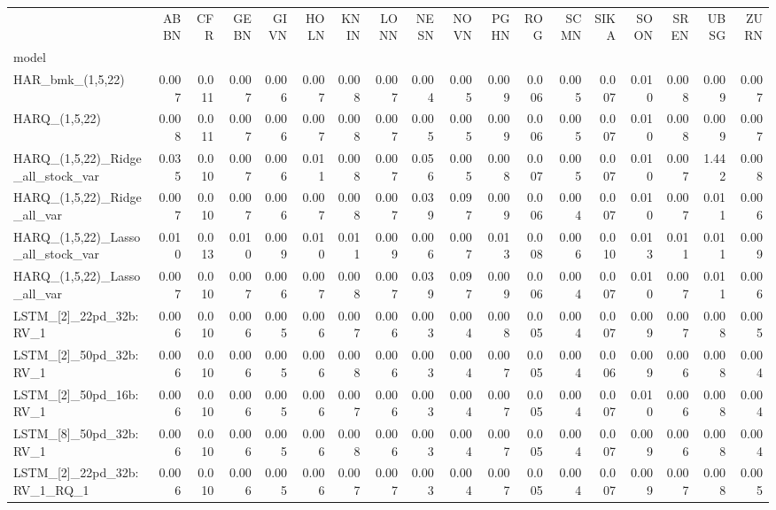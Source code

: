 \begin{tabular}{lrrrrrrrrrrrrrrrrr}
\toprule
 & ABBN & CFR & GEBN & GIVN & HOLN & KNIN & LONN & NESN & NOVN & PGHN & ROG & SCMN & SIKA & SOON & SREN & UBSG & ZURN \\
model &  &  &  &  &  &  &  &  &  &  &  &  &  &  &  &  &  \\
\midrule
HAR\_bmk\_(1,5,22) & 0.007 & 0.011 & 0.007 & 0.006 & 0.007 & 0.008 & 0.007 & 0.004 & 0.005 & 0.009 & 0.006 & 0.005 & 0.007 & 0.010 & 0.008 & 0.009 & 0.007 \\
HARQ\_(1,5,22) & 0.008 & 0.011 & 0.007 & 0.006 & 0.007 & 0.008 & 0.007 & 0.005 & 0.005 & 0.009 & 0.006 & 0.005 & 0.007 & 0.010 & 0.008 & 0.009 & 0.007 \\
HARQ\_(1,5,22)\_Ridge\_all\_stock\_var & 0.035 & 0.010 & 0.007 & 0.006 & 0.011 & 0.008 & 0.007 & 0.056 & 0.005 & 0.008 & 0.007 & 0.005 & 0.007 & 0.010 & 0.007 & 1.442 & 0.008 \\
HARQ\_(1,5,22)\_Ridge\_all\_var & 0.007 & 0.010 & 0.007 & 0.006 & 0.007 & 0.008 & 0.007 & 0.039 & 0.097 & 0.009 & 0.006 & 0.004 & 0.007 & 0.010 & 0.007 & 0.011 & 0.006 \\
HARQ\_(1,5,22)\_Lasso\_all\_stock\_var & 0.010 & 0.013 & 0.010 & 0.009 & 0.010 & 0.011 & 0.009 & 0.006 & 0.007 & 0.013 & 0.008 & 0.006 & 0.010 & 0.013 & 0.011 & 0.011 & 0.009 \\
HARQ\_(1,5,22)\_Lasso\_all\_var & 0.007 & 0.010 & 0.007 & 0.006 & 0.007 & 0.008 & 0.007 & 0.039 & 0.097 & 0.009 & 0.006 & 0.004 & 0.007 & 0.010 & 0.007 & 0.011 & 0.006 \\
LSTM\_[2]\_22pd\_32b:RV\_1 & 0.006 & 0.010 & 0.006 & 0.005 & 0.006 & 0.007 & 0.006 & 0.003 & 0.004 & 0.008 & 0.005 & 0.004 & 0.007 & 0.009 & 0.007 & 0.008 & 0.005 \\
LSTM\_[2]\_50pd\_32b:RV\_1 & 0.006 & 0.010 & 0.006 & 0.005 & 0.006 & 0.008 & 0.006 & 0.003 & 0.004 & 0.007 & 0.005 & 0.004 & 0.006 & 0.009 & 0.006 & 0.008 & 0.004 \\
LSTM\_[2]\_50pd\_16b:RV\_1 & 0.006 & 0.010 & 0.006 & 0.005 & 0.006 & 0.007 & 0.006 & 0.003 & 0.004 & 0.007 & 0.005 & 0.004 & 0.007 & 0.010 & 0.006 & 0.008 & 0.004 \\
LSTM\_[8]\_50pd\_32b:RV\_1 & 0.006 & 0.010 & 0.006 & 0.005 & 0.006 & 0.008 & 0.006 & 0.003 & 0.004 & 0.007 & 0.005 & 0.004 & 0.007 & 0.009 & 0.006 & 0.008 & 0.004 \\
LSTM\_[2]\_22pd\_32b:RV\_1\_RQ\_1 & 0.006 & 0.010 & 0.006 & 0.005 & 0.006 & 0.007 & 0.007 & 0.003 & 0.004 & 0.007 & 0.005 & 0.004 & 0.007 & 0.009 & 0.007 & 0.008 & 0.005 \\

\end{tabular}
